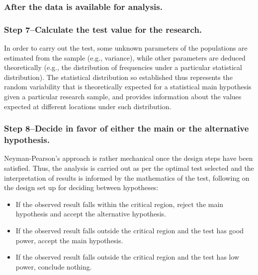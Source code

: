 \documentclass[
]{book}
\providecommand{\tightlist}{%
  \setlength{\itemsep}{0pt}\setlength{\parskip}{0pt}}
\theoremstyle{definition}
\theoremstyle{definition}
\theoremstyle{definition}
\theoremstyle{definition}
\theoremstyle{remark}
\begin{document}
\hypertarget{after-the-data-is-available-for-analysis.}{%
\subsubsection*{After the data is available for analysis.}\label{after-the-data-is-available-for-analysis.}}

\hypertarget{step-7calculate-the-test-value-for-the-research.}{%
\subsubsection*{Step 7--Calculate the test value for the research.}\label{step-7calculate-the-test-value-for-the-research.}}

In order to carry out the test, some unknown parameters of the populations are estimated from the sample (e.g., variance), while other parameters are deduced theoretically (e.g., the distribution of frequencies under a particular statistical distribution). The statistical distribution so established thus represents the random variability that is theoretically expected for a statistical main hypothesis given a particular research sample, and provides information about the values expected at different locations under such distribution.

\hypertarget{step-8decide-in-favor-of-either-the-main-or-the-alternative-hypothesis.}{%
\subsubsection*{Step 8--Decide in favor of either the main or the alternative hypothesis.}\label{step-8decide-in-favor-of-either-the-main-or-the-alternative-hypothesis.}}

Neyman-Pearson's approach is rather mechanical once the design steps have been satisfied. Thus, the analysis is carried out as per the optimal test selected and the interpretation of results is informed by the mathematics of the test, following on the design set up for deciding between hypotheses:

\begin{itemize}
\tightlist
\item
  If the observed result falls within the critical region, reject the main hypothesis and accept the alternative hypothesis.
\item
  If the observed result falls outside the critical region and the test has good power, accept the main hypothesis.
\item
  If the observed result falls outside the critical region and the test has low power, conclude nothing.
\end{itemize}
\end{document}
